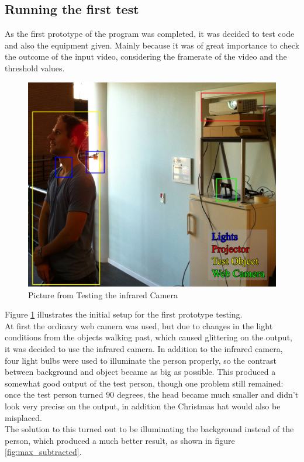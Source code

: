 \subsection{Running the first test}
As the first prototype of the program was completed, it was decided to test code and also the equipment given. Mainly because it was of great importance to check the outcome of the input video, considering the framerate of the video and the threshold values. 

\begin{figure}[htbp]
\centering
\includegraphics[width=1.00\textwidth]{Pictures/Test/TestSetup.jpg}
\caption{Picture from Testing the infrared Camera}
\label{fig:ir_cam_test}
\end{figure} 

Figure \ref{fig:ir_cam_test} illustrates the initial setup for the first prototype testing. \\
At first the ordinary web camera was used, but due to changes in the light conditions from the objects walking past, which caused glittering on the output, it was decided to use the infrared camera. In addition to the infrared camera, four light bulbs were used to illuminate the person properly, so the contrast between background and object became as big as possible. This produced a somewhat good output of the test person, though one problem still remained: once the test person turned 90 degrees, the head became much smaller and didn't look very precise on the output, in addition the Christmas hat would also be misplaced.\\
The solution to this turned out to be illuminating the background instead of the person, which produced a much better result, as shown in figure \ref{fig:max_subtracted}.


